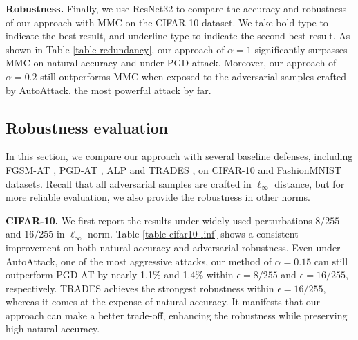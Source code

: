 \documentclass[preprint,review,12pt]{elsarticle}
\numberwithin{equation}{section}
\begin{document}
\begin{table}[!htb]
	\center
	\caption{Comparison of classification accuracy (\%) between MMC and the proposed method on CIFAR-10.
		We directly cite the * results of MMC from RobustBench \cite{croce2020b} and others from the original paper.
	}
	\label{table-redundancy}
\end{table}



\textbf{Robustness.} Finally, we use ResNet32 to compare the  accuracy and robustness of our approach with MMC \cite{pang2020} on the CIFAR-10 dataset.
We take bold type to indicate the best result, and underline type to indicate the second best result.
As shown in Table \ref{table-redundancy},
our approach of $\alpha=1$ significantly surpasses MMC on natural accuracy and under PGD attack.
Moreover, our approach of $\alpha=0.2$ still outperforms MMC
when exposed to the adversarial samples crafted by AutoAttack, the most powerful attack by far.


\subsection{Robustness evaluation}

In this section, we compare our approach with several baseline defenses,
including FGSM-AT \cite{goodfellow2015}, PGD-AT \cite{madry2018}, ALP \cite{kannan2018} and TRADES \cite{zhang2019b},
on CIFAR-10 and FashionMNIST datasets.
Recall that all adversarial samples are crafted in $\ell_{\infty}$ distance,
but for more reliable evaluation, we also provide the robustness in other norms.

\textbf{CIFAR-10.} We first report the results under widely used perturbations $8/255$ and $16/255$ in $\ell_{\infty}$ norm.
Table \ref{table-cifar10-linf} shows a consistent improvement on both natural accuracy and adversarial robustness.
Even under AutoAttack, one of the most aggressive attacks,
our method of $\alpha=0.15$ can still outperform PGD-AT by nearly 1.1\% and 1.4\% within $\epsilon=8/255$ and $\epsilon=16/255$, respectively.
TRADES achieves the strongest robustness within $\epsilon=16/255$,
whereas it comes at the expense of natural accuracy.
It manifests that our approach can make a better trade-off, enhancing the robustness while preserving high natural accuracy.
\end{document}
